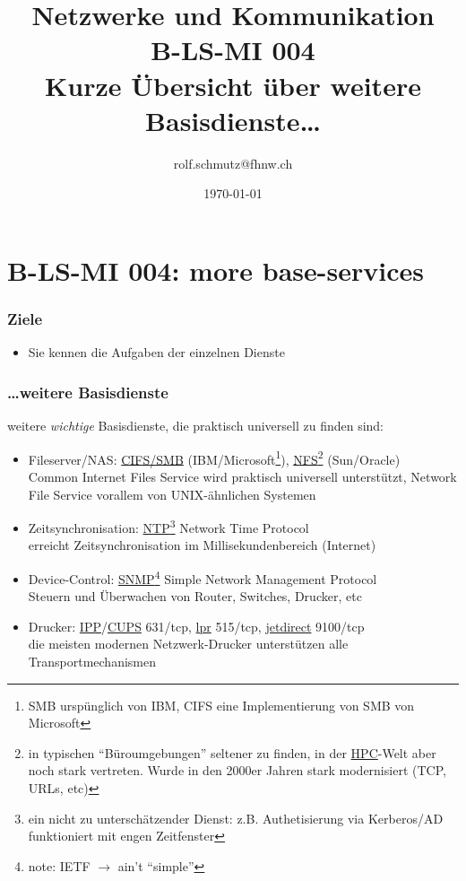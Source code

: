 \documentclass[ignorenonframetext]{beamer}
\date{\today}
\author{rolf.schmutz@fhnw.ch}
\institute{FHNW}
\title{Netzwerke und Kommunikation\\B-LS-MI 004\\Kurze \"Ubersicht \"uber weitere Basisdienste\ldots}
\begin{document}

\section{B-LS-MI 004: more base-services}



\begin{frame}
\titlepage
\end{frame}



\begin{frame}
\frametitle{Ziele}
\begin{itemize}
	\item{Sie kennen die Aufgaben der einzelnen Dienste}
\end{itemize}
\end{frame}



\begin{frame}
\frametitle{\ldots weitere Basisdienste}
weitere {\em wichtige} Basisdienste, die praktisch universell zu finden sind:
\\
\vspace{0.25cm}
\begin{itemize}
	\item Fileserver/NAS: \href{https://en.wikipedia.org/wiki/Server_Message_Block}{CIFS/SMB} (IBM/Microsoft\footnote{SMB ursp\"unglich von IBM, CIFS eine Implementierung von SMB von Microsoft}), \href{https://en.wikipedia.org/wiki/Network_File_System}{NFS}\footnote{in typischen ``B\"uroumgebungen'' seltener zu finden, in der \href{https://en.wikipedia.org/wiki/Supercomputer}{HPC}-Welt aber noch stark vertreten. Wurde in den 2000er Jahren stark modernisiert (TCP, URLs, etc)} (Sun/Oracle)\\Common Internet Files Service wird praktisch universell unterst\"utzt, Network File Service vorallem von UNIX-\"ahnlichen Systemen
	\item Zeitsynchronisation: \href{http://support.ntp.org/bin/view/Main/WebHome}{NTP}\footnote{ein nicht zu untersch\"atzender Dienst: z.B. Authetisierung via Kerberos/AD funktioniert mit engen Zeitfenster} Network Time Protocol\\erreicht Zeitsynchronisation im Millisekundenbereich (Internet)
	\item Device-Control: \href{https://en.wikipedia.org/wiki/}{SNMP}\footnote{note: IETF $\rightarrow$ ain't ``simple''} Simple Network Management Protocol\\Steuern und \"Uberwachen von Router, Switches, Drucker, etc
	\item Drucker: \href{https://en.wikipedia.org/wiki/Internet_Printing_Protocol}{IPP}/\href{https://en.wikipedia.org/wiki/CUPS}{CUPS} 631/tcp, \href{https://en.wikipedia.org/wiki/Line_Printer_Daemon_protocol}{lpr} 515/tcp, \href{https://en.wikipedia.org/wiki/JetDirect}{jetdirect} 9100/tcp\\
	die meisten modernen Netzwerk-Drucker unterst\"utzen alle Transportmechanismen
\end{itemize}
\end{frame}
\end{document}
